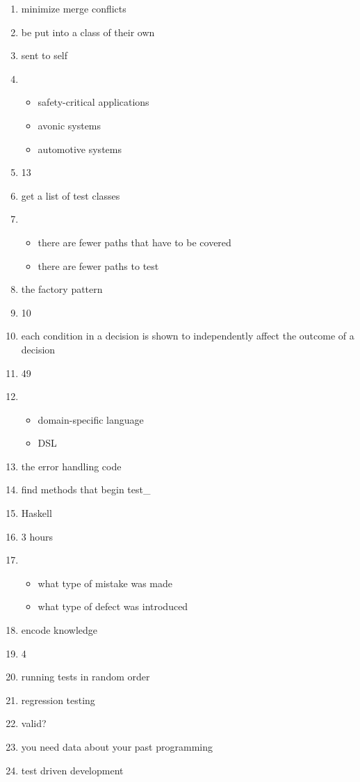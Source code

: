 \documentclass{exam}
\begin{document}
\begin{enumerate}
\item minimize merge conflicts
\item be put into a class of their own
\item sent to self
\item \begin{itemize}
\item safety-critical applications
\item avonic systems
\item automotive systems
\end{itemize}
\item 13
\item get a list of test classes
\item \begin{itemize}
\item there are fewer paths that have to be covered
\item there are fewer paths to test
\end{itemize}
\item the factory pattern
\item 10
\item each condition in a decision is shown to independently affect the outcome of a decision
\item 49
\item \begin{itemize}
\item domain-specific language
\item DSL
\end{itemize}
\item the error handling code
\item find methods that begin test\_
\item Haskell
\item 3 hours
\item \begin{itemize}
\item what type of mistake was made
\item what type of defect was introduced
\end{itemize}
\item encode knowledge
\item 4
\item running tests in random order
\item regression testing
\item valid?
\item you need data about your past programming
\item test driven development

\end{enumerate}
\end{document}
